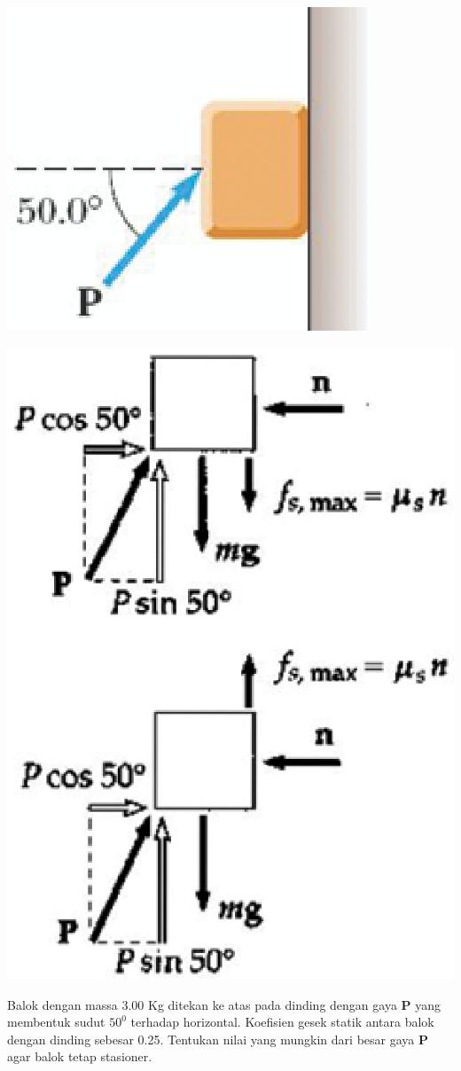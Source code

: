 \question[10]
\mbox{}
\begin{center}
\includegraphics [scale=0.6]{./latex/eps/1_5_14_image_1.eps}
\end{center}

\begin{center}
\includegraphics [scale=0.4]{./latex/eps/1_5_14_image_2.eps}
\end{center}
Balok dengan massa 3.00 Kg ditekan ke atas pada dinding dengan gaya \textbf{P} yang membentuk sudut $50^{0}$ terhadap horizontal. Koefisien gesek statik antara balok dengan dinding sebesar 0.25. Tentukan nilai yang mungkin dari besar gaya \textbf{P} agar balok tetap stasioner.

